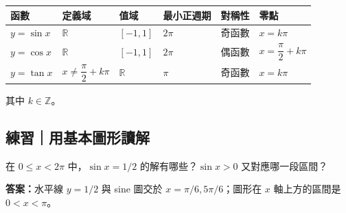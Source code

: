 \documentclass[11pt,a4paper]{article}
\newcounter{none}
\begin{document}
{\def\LTcaptype{none} %
\begin{longtable}[]{@{}
  >{\raggedright\arraybackslash}p{}
  >{\raggedright\arraybackslash}p{}
  >{\raggedright\arraybackslash}p{}
  >{\raggedleft\arraybackslash}p{}
  >{\raggedright\arraybackslash}p{}
  >{\raggedright\arraybackslash}p{}@{}}
\toprule\noalign{}
\begin{minipage}[b]{\linewidth}\raggedright
函數
\end{minipage} & \begin{minipage}[b]{\linewidth}\raggedright
定義域
\end{minipage} & \begin{minipage}[b]{\linewidth}\raggedright
值域
\end{minipage} & \begin{minipage}[b]{\linewidth}\raggedleft
最小正週期
\end{minipage} & \begin{minipage}[b]{\linewidth}\raggedright
對稱性
\end{minipage} & \begin{minipage}[b]{\linewidth}\raggedright
零點
\end{minipage} \\
\midrule\noalign{}
\endhead
\bottomrule\noalign{}
\endlastfoot
\(y=\sin x\) & \(\mathbb R\) & \([-1,1]\) & \(2\pi\) & 奇函數 & \(x=k\pi\) \\
\(y=\cos x\) & \(\mathbb R\) & \([-1,1]\) & \(2\pi\) & 偶函數 & \(x=\dfrac\pi2+k\pi\) \\
\(y=\tan x\) & \(x\ne\dfrac\pi2+k\pi\) & \(\mathbb R\) & \(\pi\) & 奇函數 & \(x=k\pi\) \\
\end{longtable}
}

其中 \(k\in\mathbb Z\)。

\begin{HandoutSelfCheck}

\subsection{練習｜用基本圖形讀解}\label{ux7df4ux7fd2ux7528ux57faux672cux5716ux5f62ux8b80ux89e3}

在 \(0\le x<2\pi\) 中，\(\sin x=1/2\) 的解有哪些？\(\sin x>0\) 又對應哪一段區間？

\textbf{答案：}水平線 \(y=1/2\) 與 sine 圖交於 \(x=\pi/6,5\pi/6\)；圖形在 \(x\) 軸上方的區間是 \(0<x<\pi\)。

\end{HandoutSelfCheck}
\end{document}
